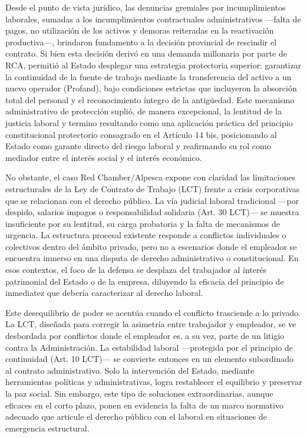 \documentclass[]{informeutn}
\begin{document}
    Desde el punto de vista jurídico, las denuncias gremiales por incumplimientos laborales, sumadas a los
    incumplimientos contractuales administrativos —falta de pagos, no utilización de los activos y demoras
    reiteradas en la reactivación productiva—, brindaron fundamento a la decisión provincial de
    rescindir el contrato. Si bien esta decisión derivó en una demanda millonaria por parte de RCA, permitió al Estado
    desplegar una estrategia protectoria superior: garantizar la continuidad de la fuente de trabajo mediante la
    transferencia del activo a un nuevo operador (Profand), bajo condiciones estrictas que incluyeron la absorción total
    del personal y el reconocimiento íntegro de la antigüedad. Este mecanismo administrativo de protección suplió, de
    manera excepcional, la lentitud de la justicia laboral y termino resultando como una aplicación práctica del
    principio constitucional protectorio consagrado en el Artículo 14 bis, posicionando al Estado como garante directo
    del riesgo laboral y reafirmando su rol como mediador entre el interés social y el interés económico.

    No obstante, el caso Red Chamber/Alpesca expone con claridad las limitaciones estructurales de la Ley de Contrato de
    Trabajo (LCT) frente a crisis corporativas que se relacionan con el derecho público. La vía judicial laboral
    tradicional —por despido, salarios impagos o responsabilidad solidaria (Art. 30 LCT)— se muestra insuficiente por su
    lentitud, su carga probatoria y la falta de mecanismos de urgencia. La estructura procesal existente responde a
    conflictos individuales o colectivos dentro del ámbito privado, pero no a escenarios donde el empleador se encuentra
    inmerso en una disputa de derecho administrativo o constitucional. En esos contextos, el foco de la defensa se
    desplaza del trabajador al interés patrimonial del Estado o de la empresa, diluyendo la eficacia del principio de
    inmediatez que debería caracterizar al derecho laboral.

    Este desequilibrio de poder se acentúa cuando el conflicto trasciende a lo privado. La LCT, diseñada para
    corregir la asimetría entre trabajador y empleador, se ve desbordada por conflictos donde el empleador es, a su vez,
    parte de un litigio contra la Administración. La estabilidad laboral —protegida por el principio de continuidad
    (Art. 10 LCT)— se convierte entonces en un elemento subordinado al contrato administrativo. Solo la intervención del
    Estado, mediante herramientas políticas y administrativas, logra restablecer el equilibrio y preservar la paz
    social. Sin embargo, este tipo de soluciones extraordinarias, aunque eficaces en el corto plazo, ponen en evidencia
    la falta de un marco normativo adecuado que articule el derecho público con el laboral en situaciones de emergencia
    estructural.
\end{document}
